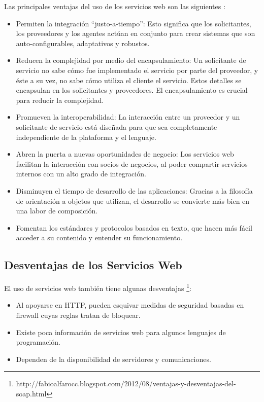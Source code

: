 	Las principales ventajas del uso de los servicios web son las siguientes \citep{doctorado2005}:
\begin{itemize}
	\item Permiten la integración “justo-a-tiempo”:  Esto significa que los solicitantes, los proveedores y los agentes actúan en conjunto para crear sistemas que son auto-configurables, adaptativos y robustos.
	\item Reducen la complejidad por medio del encapsulamiento: Un solicitante de servicio no sabe cómo fue implementado el servicio por parte del proveedor, y éste a su vez, no sabe cómo utiliza el cliente el servicio. Estos detalles se encapsulan en los solicitantes y proveedores. El encapsulamiento es crucial para reducir la complejidad.
	\item Promueven la interoperabilidad: La interacción entre un proveedor y un solicitante de servicio está diseñada para que sea completamente independiente de la plataforma y el lenguaje. 
	\item Abren la puerta a nuevas oportunidades de negocio: Los servicios web facilitan la interacción con socios de negocios, al poder compartir servicios internos con un alto grado de integración.
	\item Disminuyen el tiempo de desarrollo de las aplicaciones: Gracias a la filosofía de orientación a objetos que utilizan, el desarrollo se convierte más bien en una labor de composición.
	\item Fomentan los estándares y protocolos basados en texto, que hacen más fácil acceder a su contenido y entender su funcionamiento.
\end{itemize}


\subsection{Desventajas de los  Servicios Web}
\label{cap:subsec:desventajasserviciosweb}
	El uso de servicios web también tiene algunas desventajas \footnote{http://fabioalfarocc.blogspot.com/2012/08/ventajas-y-desventajas-del-soap.html}:
\begin{itemize}
	\item Al apoyarse en HTTP, pueden esquivar medidas de seguridad basadas en firewall cuyas reglas tratan de bloquear.
	\item Existe poca información de servicios web para algunos lenguajes de programación.
	\item Dependen de la disponibilidad de servidores y comunicaciones.
\end{itemize}

